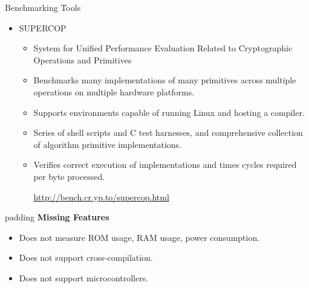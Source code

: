 \documentclass[xcolor=pdftex,dvipsnames,table,final]{beamer}
\begin{document}
\begin{frame}[fragile]{}
\begin{columns}[t, totalwidth=\textwidth]
\begin{column}{.31\linewidth}
      \begin{block}{Benchmarking Tools}
        \begin{itemize}
          \item SUPERCOP
            \begin{itemize}
              \item System for Unified Performance Evaluation Related to Cryptographic Operations and Primitives
              \item Benchmarks many implementations of many primitives across multiple
                  operations on multiple hardware platforms.
              \item Supports environments capable of running Linux and hosting a
                  compiler.
              \item Series of shell scripts and C test harnesses, and comprehensive
                  collection of algorithm primitive implementations.
              \item Verifies correct execution of implementations and times cycles
                  required per byte processed.
              \begin{center}
                  \url{http://bench.cr.yp.to/supercop.html}
              \end{center}
            \end{itemize}
        \end{itemize}
        \begin{center}
        \begin{minipage}[t]{0.9\linewidth}  
        \begin{beamercolorbox}[rounded=true]{padding}
          \textbf{Missing Features}\small
          \begin{itemize}
            \item Does not measure ROM usage, RAM usage, power consumption.
            \item Does not support cross-compilation.
            \item Does not support microcontrollers.
          \end{itemize}
        \end{beamercolorbox}
        \end{minipage}
        \end{center}

\end{block}
\end{column}
\end{columns}
\end{frame}
\end{document}
